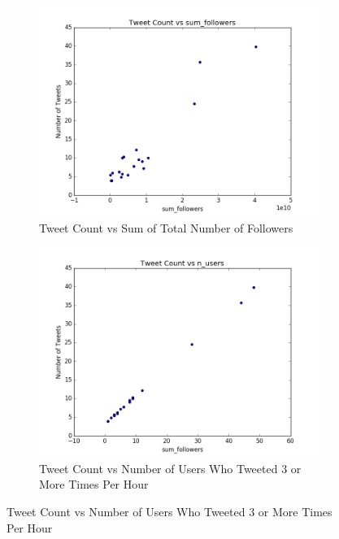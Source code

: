 \documentclass[12pt]{article}
\begin{document}
\begin{figure}[H]
\centering
\begin{subfigure}{.45\textwidth}
  \centering
\includegraphics[width=\textwidth]{figures/count_vs_sum_tweets_gopatriots.png}
\caption{Tweet Count vs Sum of Total Number of Followers}
\label{part1:fig:LC}
\end{subfigure}%
\hfill
\begin{subfigure}{.45\textwidth}
  \centering
\includegraphics[width=\textwidth]{figures/count_vs_n_users_tweets_gopatriots.png}
\caption{Tweet Count vs Number of Users Who Tweeted 3 or More Times Per Hour}
\label{part1:fig:LC}
\end{subfigure}


\end{figure}
\end{document}
